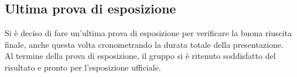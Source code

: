 \subsection{Ultima prova di esposizione}
Si è deciso di fare un'ultima prova di esposizione per verificare la buona riuscita finale, anche questa volta cronometrando la durata totale della presentazione.
\\Al termine della prova di esposizione, il gruppo si è ritenuto soddisfatto del risultato e pronto per l'esposizione ufficiale.
